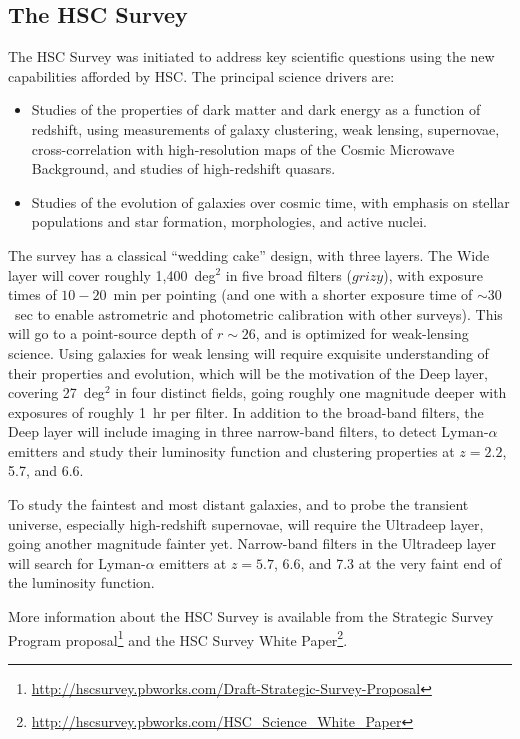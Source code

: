 \documentclass[12pt]{article}
\begin{document}
\subsection{The HSC Survey}


The HSC Survey was initiated to address key scientific questions using the new capabilities afforded by HSC.
The principal science drivers are:
\begin{itemize}
\item Studies of the properties of dark matter and dark energy as a
  function of redshift, using measurements of galaxy clustering, weak
  lensing, supernovae, cross-correlation with high-resolution maps
  of the Cosmic Microwave Background, and studies of high-redshift
  quasars.
\item Studies of the evolution of galaxies over cosmic time, with
  emphasis on stellar populations and star formation, morphologies, and
  active nuclei.
\end{itemize}

The survey has a classical ``wedding cake'' design, with three layers.  The Wide layer will cover roughly
1,400~deg$^2$ in five broad filters ($grizy$), with exposure times of $10-20$~min per pointing (and one with a
shorter exposure time of $\sim 30$~sec to enable astrometric and photometric calibration with other surveys).
This will go to a point-source depth of $r\sim 26$, and is optimized for weak-lensing science.  Using galaxies
for weak lensing will require exquisite understanding of their properties and evolution, which will be the
motivation of the Deep layer, covering 27~deg$^2$ in four distinct fields, going roughly one magnitude deeper
with exposures of roughly 1~hr per filter.  In addition to the broad-band filters, the Deep layer will include
imaging in three narrow-band filters, to detect Lyman-$\alpha$ emitters and study their luminosity function
and clustering properties at $z = 2.2$, 5.7, and 6.6.

To study the faintest and most distant galaxies, and to probe the
transient universe, especially high-redshift supernovae, will require
the Ultradeep layer, going another magnitude fainter yet.  Narrow-band
filters in the Ultradeep layer will search for Lyman-$\alpha$
emitters at $z = 5.7$, 6.6, and 7.3 at the very faint end of the
luminosity function.

More information about the HSC Survey is available from the Strategic Survey Program
proposal\footnote{\url{http://hscsurvey.pbworks.com/Draft-Strategic-Survey-Proposal}} and the HSC Survey White
Paper\footnote{\url{http://hscsurvey.pbworks.com/HSC_Science_White_Paper}}.
\end{document}
